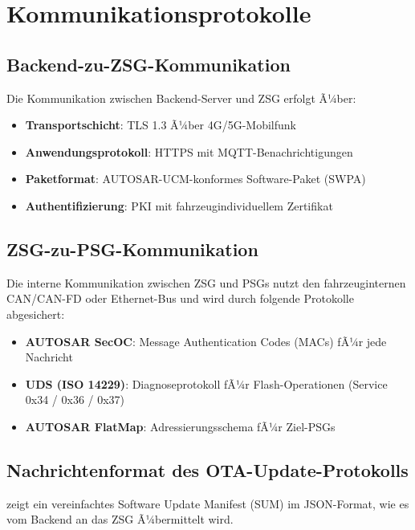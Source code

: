 ﻿\documentclass[12pt,a4paper,twoside]{article}
\begin{document}
\section{Kommunikationsprotokolle}
\label{sec:protokolle}


\subsection{Backend-zu-ZSG-Kommunikation}

Die Kommunikation zwischen Backend-Server und ZSG erfolgt Ã¼ber:

\begin{itemize}
  \item \textbf{Transportschicht}: TLS 1.3 Ã¼ber 4G/5G-Mobilfunk
  \item \textbf{Anwendungsprotokoll}: HTTPS mit MQTT-Benachrichtigungen
  \item \textbf{Paketformat}: AUTOSAR-UCM-konformes Software-Paket (SWPA)
  \item \textbf{Authentifizierung}: PKI mit fahrzeugindividuellem Zertifikat
\end{itemize}

\subsection{ZSG-zu-PSG-Kommunikation}

Die interne Kommunikation zwischen ZSG und PSGs nutzt den fahrzeuginternen
CAN/CAN-FD oder Ethernet-Bus und wird durch folgende Protokolle abgesichert:

\begin{itemize}
  \item \textbf{AUTOSAR SecOC}: Message Authentication Codes (MACs) fÃ¼r
    jede Nachricht
  \item \textbf{UDS (ISO 14229)}: Diagnoseprotokoll fÃ¼r Flash-Operationen
    (Service 0x34 / 0x36 / 0x37)
  \item \textbf{AUTOSAR FlatMap}: Adressierungsschema fÃ¼r Ziel-PSGs
\end{itemize}

\subsection{Nachrichtenformat des OTA-Update-Protokolls}

 zeigt ein vereinfachtes Software Update Manifest (SUM)
im JSON-Format, wie es vom Backend an das ZSG Ã¼bermittelt wird.
\end{document}
